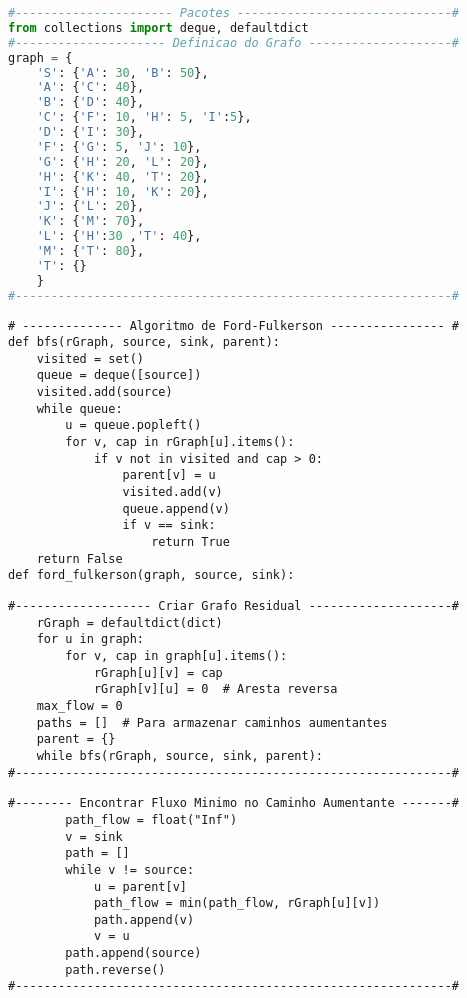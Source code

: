 \documentclass[12pt]{article}
\begin{document}
\begin{lstlisting}[language=Python, caption={}, label={lst:fordfulkerson}]
#---------------------- Pacotes ------------------------------#
from collections import deque, defaultdict
#--------------------- Definicao do Grafo --------------------#
graph = {
    'S': {'A': 30, 'B': 50},
    'A': {'C': 40},
    'B': {'D': 40},
    'C': {'F': 10, 'H': 5, 'I':5},
    'D': {'I': 30},
    'F': {'G': 5, 'J': 10},
    'G': {'H': 20, 'L': 20},
    'H': {'K': 40, 'T': 20},
    'I': {'H': 10, 'K': 20},
    'J': {'L': 20},
    'K': {'M': 70},
    'L': {'H':30 ,'T': 40},
    'M': {'T': 80},
    'T': {}
    }
#-------------------------------------------------------------#
\end{lstlisting}


\begin{lstlisting}
# -------------- Algoritmo de Ford-Fulkerson ---------------- #
def bfs(rGraph, source, sink, parent):
    visited = set()
    queue = deque([source])
    visited.add(source)
    while queue:
        u = queue.popleft()
        for v, cap in rGraph[u].items():
            if v not in visited and cap > 0:
                parent[v] = u
                visited.add(v)
                queue.append(v)
                if v == sink:
                    return True
    return False
def ford_fulkerson(graph, source, sink):
\end{lstlisting}

\newpage
\begin{lstlisting}
#------------------- Criar Grafo Residual --------------------#
    rGraph = defaultdict(dict)
    for u in graph:
        for v, cap in graph[u].items():
            rGraph[u][v] = cap
            rGraph[v][u] = 0  # Aresta reversa
    max_flow = 0
    paths = []  # Para armazenar caminhos aumentantes
    parent = {}
    while bfs(rGraph, source, sink, parent):
#-------------------------------------------------------------#
\end{lstlisting}

\begin{lstlisting}
#-------- Encontrar Fluxo Minimo no Caminho Aumentante -------#
        path_flow = float("Inf")
        v = sink
        path = []
        while v != source:
            u = parent[v]
            path_flow = min(path_flow, rGraph[u][v])
            path.append(v)
            v = u
        path.append(source)
        path.reverse()
#-------------------------------------------------------------#
\end{lstlisting}
\end{document}
